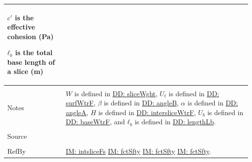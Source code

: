 \documentclass[12pt]{article}
\begin{document}
\begin{minipage}{\textwidth}
\begin{tabular}{p{} p{}}
\begin{symbDescription}
                                         \item{$c'$ is the effective cohesion (Pa)}
                                         \item{${ℓ_{b}}$ is the total base length of a slice (m)}
                                         \end{symbDescription}
                                         \\ \midrule \\
                                         Notes & $W$ is defined in \hyperref[DD:sliceWght]{DD: sliceWght}, ${U_{t}}$ is defined in \hyperref[DD:surfWtrF]{DD: surfWtrF}, $β$ is defined in \hyperref[DD:angleB]{DD: angleB}, $α$ is defined in \hyperref[DD:angleA]{DD: angleA}, $H$ is defined in \hyperref[DD:intersliceWtrF]{DD: intersliceWtrF}, ${U_{b}}$ is defined in \hyperref[DD:baseWtrF]{DD: baseWtrF}, and ${ℓ_{b}}$ is defined in \hyperref[DD:lengthLb]{DD: lengthLb}.
                                                 \\ \midrule \\
                                                 Source & \cite{chen2005}
                                                          \\ \midrule \\
                                                          RefBy & \hyperref[IM:intsliceFs]{IM: intsliceFs} \hyperref[IM:fctSfty]{IM: fctSfty} \hyperref[IM:fctSfty]{IM: fctSfty} \hyperref[IM:fctSfty]{IM: fctSfty}.
\\ \bottomrule \end{tabular}
\end{minipage}
\par~
\end{document}
